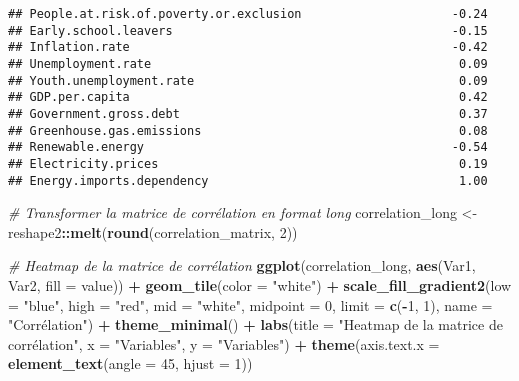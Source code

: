 \documentclass[
]{article}
\newenvironment{Shaded}{\begin{snugshade}}{\end{snugshade}}
\newcommand{\AttributeTok}[1]{\textcolor[rgb]{0.13,0.29,0.53}{#1}}
\newcommand{\CommentTok}[1]{\textcolor[rgb]{0.56,0.35,0.01}{\textit{#1}}}
\newcommand{\DecValTok}[1]{\textcolor[rgb]{0.00,0.00,0.81}{#1}}
\newcommand{\FunctionTok}[1]{\textcolor[rgb]{0.13,0.29,0.53}{\textbf{#1}}}
\newcommand{\NormalTok}[1]{#1}
\newcommand{\OtherTok}[1]{\textcolor[rgb]{0.56,0.35,0.01}{#1}}
\newcommand{\SpecialCharTok}[1]{\textcolor[rgb]{0.81,0.36,0.00}{\textbf{#1}}}
\newcommand{\StringTok}[1]{\textcolor[rgb]{0.31,0.60,0.02}{#1}}
\begin{document}
\begin{verbatim}
## People.at.risk.of.poverty.or.exclusion                     -0.24
## Early.school.leavers                                       -0.15
## Inflation.rate                                             -0.42
## Unemployment.rate                                           0.09
## Youth.unemployment.rate                                     0.09
## GDP.per.capita                                              0.42
## Government.gross.debt                                       0.37
## Greenhouse.gas.emissions                                    0.08
## Renewable.energy                                           -0.54
## Electricity.prices                                          0.19
## Energy.imports.dependency                                   1.00
\end{verbatim}

\begin{Shaded}
\begin{Highlighting}[]
\CommentTok{\# Transformer la matrice de corrélation en format long}
\NormalTok{correlation\_long }\OtherTok{\textless{}{-}}\NormalTok{ reshape2}\SpecialCharTok{::}\FunctionTok{melt}\NormalTok{(}\FunctionTok{round}\NormalTok{(correlation\_matrix, }\DecValTok{2}\NormalTok{))}
\end{Highlighting}
\end{Shaded}

\begin{Shaded}
\begin{Highlighting}[]
\CommentTok{\# Heatmap de la matrice de corrélation}
\FunctionTok{ggplot}\NormalTok{(correlation\_long, }\FunctionTok{aes}\NormalTok{(Var1, Var2, }\AttributeTok{fill =}\NormalTok{ value)) }\SpecialCharTok{+}
  \FunctionTok{geom\_tile}\NormalTok{(}\AttributeTok{color =} \StringTok{"white"}\NormalTok{) }\SpecialCharTok{+}
  \FunctionTok{scale\_fill\_gradient2}\NormalTok{(}\AttributeTok{low =} \StringTok{"blue"}\NormalTok{, }\AttributeTok{high =} \StringTok{"red"}\NormalTok{, }\AttributeTok{mid =} \StringTok{"white"}\NormalTok{, }
                       \AttributeTok{midpoint =} \DecValTok{0}\NormalTok{, }\AttributeTok{limit =} \FunctionTok{c}\NormalTok{(}\SpecialCharTok{{-}}\DecValTok{1}\NormalTok{, }\DecValTok{1}\NormalTok{), }
                       \AttributeTok{name =} \StringTok{"Corrélation"}\NormalTok{) }\SpecialCharTok{+}
  \FunctionTok{theme\_minimal}\NormalTok{() }\SpecialCharTok{+}
  \FunctionTok{labs}\NormalTok{(}\AttributeTok{title =} \StringTok{"Heatmap de la matrice de corrélation"}\NormalTok{,}
       \AttributeTok{x =} \StringTok{"Variables"}\NormalTok{,}
       \AttributeTok{y =} \StringTok{"Variables"}\NormalTok{) }\SpecialCharTok{+}
  \FunctionTok{theme}\NormalTok{(}\AttributeTok{axis.text.x =} \FunctionTok{element\_text}\NormalTok{(}\AttributeTok{angle =} \DecValTok{45}\NormalTok{, }\AttributeTok{hjust =} \DecValTok{1}\NormalTok{))}
\end{Highlighting}
\end{Shaded}
\end{document}
